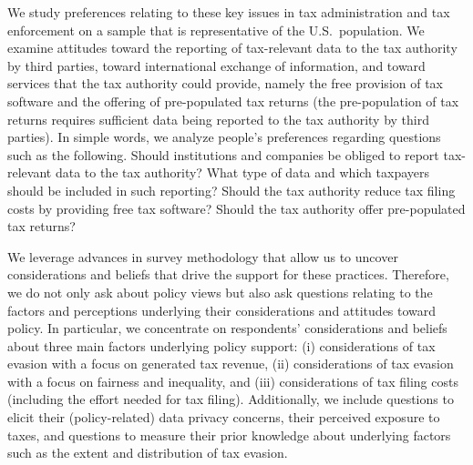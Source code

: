 \documentclass[12pt]{article}
\begin{document}
We study preferences relating to these key issues in tax administration and tax enforcement on a sample that is representative of the U.S.\ population. We examine attitudes toward the reporting of tax-relevant data to the tax authority by third parties, toward international exchange of information, and toward services that the tax authority could provide, namely the free provision of tax software and the offering of pre-populated tax returns (the pre-population of tax returns requires sufficient data being reported to the tax authority by third parties). In simple words, we analyze people's preferences regarding questions such as the following. Should institutions and companies be obliged to report tax-relevant data to the tax authority? What type of data and which taxpayers should be included in such reporting? Should the tax authority reduce tax filing costs by providing free tax software? Should the tax authority offer pre-populated tax returns?

We leverage advances in survey methodology that allow us to uncover considerations and beliefs that drive the support for these practices. Therefore, we do not only ask about policy views but also ask questions relating to the factors and perceptions underlying their considerations and attitudes toward policy. In particular, we concentrate on respondents' considerations and beliefs about three main factors underlying policy support: (i) considerations of tax evasion with a focus on generated tax revenue, (ii) considerations of tax evasion with a focus on fairness and inequality, and (iii) considerations of tax filing costs (including the effort needed for tax filing). Additionally, we include questions to elicit their (policy-related) data privacy concerns, their perceived exposure to taxes, and questions to measure their prior knowledge about underlying factors such as the extent and distribution of tax evasion. 

\end{document}
